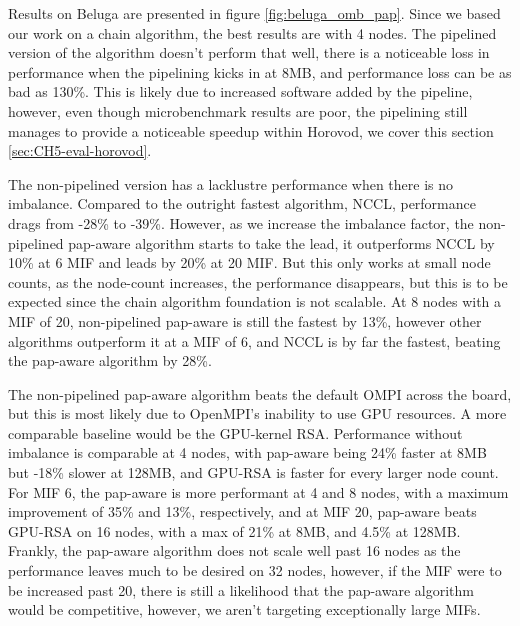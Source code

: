 


Results on Beluga are presented in figure \ref{fig:beluga_omb_pap}.
Since we based our work on a chain algorithm, the best results are with 4 nodes.
The pipelined version of the algorithm doesn't perform that well, there is a noticeable loss in performance when the pipelining kicks in at 8MB, and performance loss can be as bad as 130\%.
This is likely due to increased software added by the pipeline, however, even though microbenchmark results are poor, the pipelining still manages to provide a noticeable speedup within Horovod, we cover this section \ref{sec:CH5-eval-horovod}.

The non-pipelined version has a lacklustre performance when there is no imbalance.
Compared to the outright fastest algorithm, NCCL, performance drags from -28\% to -39\%.
However, as we increase the imbalance factor, the non-pipelined pap-aware algorithm starts to take the lead, it outperforms NCCL by 10\% at 6 MIF and leads by 20\% at 20 MIF.
But this only works at small node counts, as the node-count increases, the performance disappears, but this is to be expected since the chain algorithm foundation is not scalable.
At 8 nodes with a MIF of 20, non-pipelined pap-aware is still the fastest by 13\%, however other algorithms outperform it at a MIF of 6, and NCCL is by far the fastest, beating the pap-aware algorithm by 28\%.

The non-pipelined pap-aware algorithm beats the default OMPI across the board, but this is most likely due to OpenMPI's inability to use GPU resources.
A more comparable baseline would be the GPU-kernel RSA.
Performance without imbalance is comparable at 4 nodes, with pap-aware being 24\% faster at 8MB but -18\% slower at 128MB, and GPU-RSA is faster for every larger node count.
For MIF 6, the pap-aware is more performant at 4 and 8 nodes, with a maximum improvement of 35\% and 13\%, respectively, and at MIF 20, pap-aware beats GPU-RSA on 16 nodes, with a max of 21\% at 8MB, and 4.5\% at 128MB.
Frankly, the pap-aware algorithm does not scale well past 16 nodes as the performance leaves much to be desired  on 32 nodes, however, if the MIF were to be increased past 20, there is still a likelihood that the pap-aware algorithm would be competitive, however, we aren't targeting exceptionally large MIFs. 



